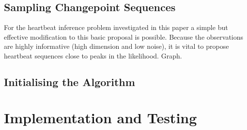 \documentclass{article}
\begin{document}
\subsection{Sampling Changepoint Sequences}

For the heartbeat inference problem investigated in this paper a simple but effective modification to this basic proposal is possible. Because the observations are highly informative (high dimension and low noise), it is vital to propose heartbeat sequences close to peaks in the likelihood. {\meta Graph.}



\subsection{Initialising the Algorithm}




\section{Implementation and Testing}




\end{document}
